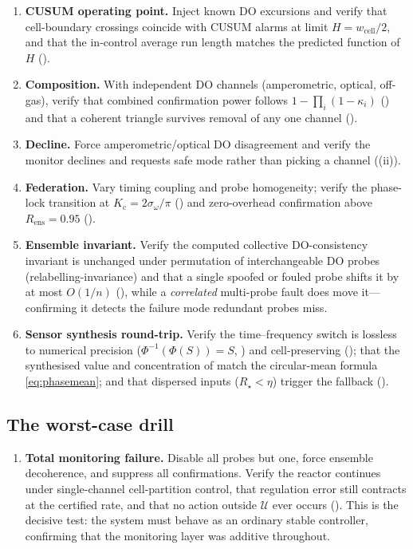 \documentclass[11pt,a4paper,twocolumn]{article}
\theoremstyle{thmstyle}
\theoremstyle{definition}
\theoremstyle{remark}
\newcommand{\Us}{\mathcal{U}}
\newcommand{\wcell}{w_{\mathrm{cell}}}
\newcommand{\Rens}{R_{\mathrm{ens}}}
\newcommand{\Rstar}{R_{\star}}
\newcommand{\Kc}{K_{\mathrm{c}}}
\begin{document}
\begin{enumerate}[label=\textbf{V\arabic*.},leftmargin=2.4em,itemsep=2pt,start=7]
\item \textbf{CUSUM operating point.} Inject known DO excursions and verify
that cell-boundary crossings coincide with CUSUM alarms at limit
$H=\wcell/2$, and that the in-control average run length matches the
predicted function of $H$ ().
\item \textbf{Composition.} With independent DO channels (amperometric,
optical, off-gas), verify that combined confirmation power follows
$1-\prod_i(1-\kappa_i)$ () and that a coherent
triangle survives removal of any one channel ().
\item \textbf{Decline.} Force amperometric/optical DO disagreement and
verify the monitor declines and requests safe mode rather than picking a
channel ((ii)).
\item \textbf{Federation.} Vary timing coupling and probe homogeneity;
verify the phase-lock transition at $\Kc=2\sigma_\omega/\pi$
() and zero-overhead confirmation above
$\Rens=0.95$ ().
\item \textbf{Ensemble invariant.} Verify the computed collective
DO-consistency invariant is unchanged under permutation of interchangeable
DO probes (relabelling-invariance) and that a single spoofed or fouled
probe shifts it by at most $O(1/n)$
(), while a
\emph{correlated} multi-probe fault does move it---confirming it detects
the failure mode redundant probes miss.
\item \textbf{Sensor synthesis round-trip.} Verify the time--frequency
switch is lossless to numerical precision ($\Phi^{-1}(\Phi(S))=S$,
) and cell-preserving (); that
the synthesised value and concentration of  match the
circular-mean formula \eqref{eq:phasemean}; and that dispersed inputs
($\Rstar<\eta$) trigger the fallback ().
\end{enumerate}

\subsection{The worst-case drill}

\begin{enumerate}[label=\textbf{V\arabic*.},leftmargin=2.4em,itemsep=2pt,start=12]
\item \textbf{Total monitoring failure.} Disable all probes but one, force
ensemble decoherence, and suppress all confirmations. Verify the reactor
continues under single-channel cell-partition control, that regulation
error still contracts at the certified rate, and that no action outside
$\Us$ ever occurs (). This is the decisive test: the
system must behave as an ordinary stable controller, confirming that the
monitoring layer was additive throughout.
\end{enumerate}
\end{document}
